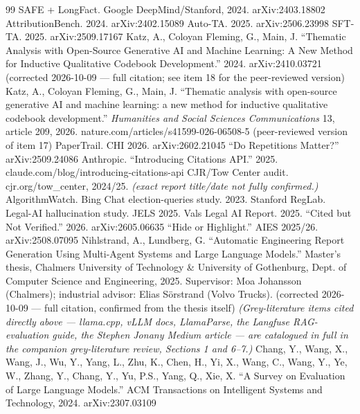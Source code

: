 \begin{thebibliography}{99}
 SAFE + LongFact. Google DeepMind/Stanford, 2024. arXiv:2403.18802
 AttributionBench. 2024. arXiv:2402.15089
 Auto-TA. 2025. arXiv:2506.23998
 SFT-TA. 2025. arXiv:2509.17167
 Katz, A., Coloyan Fleming, G., Main, J. \textquotedblleft{}Thematic Analysis with Open-Source Generative AI and Machine Learning: A New Method for Inductive Qualitative Codebook Development.\textquotedblright{} 2024. arXiv:2410.03721 (corrected 2026-10-09 — full citation; see item 18 for the peer-reviewed version)
 Katz, A., Coloyan Fleming, G., Main, J. \textquotedblleft{}Thematic analysis with open-source generative AI and machine learning: a new method for inductive qualitative codebook development.\textquotedblright{} \textit{Humanities and Social Sciences Communications} 13, article 209, 2026. nature.com/articles/s41599-026-06508-5 (peer-reviewed version of item 17)
 PaperTrail. CHI 2026. arXiv:2602.21045
 \textquotedblleft{}Do Repetitions Matter?\textquotedblright{} arXiv:2509.24086
 Anthropic. \textquotedblleft{}Introducing Citations API.\textquotedblright{} 2025. claude.com/blog/introducing-citations-api
 CJR/Tow Center audit. cjr.org/tow\_center, 2024/25. \textit{(exact report title/date not fully confirmed.)}
 AlgorithmWatch. Bing Chat election-queries study. 2023.
 Stanford RegLab. Legal-AI hallucination study. JELS 2025.
 Vals Legal AI Report. 2025.
 \textquotedblleft{}Cited but Not Verified.\textquotedblright{} 2026. arXiv:2605.06635
 \textquotedblleft{}Hide or Highlight.\textquotedblright{} AIES 2025/26. arXiv:2508.07095
 Nihlstrand, A., Lundberg, G. \textquotedblleft{}Automatic Engineering Report Generation Using Multi-Agent Systems and Large Language Models.\textquotedblright{} Master's thesis, Chalmers University of Technology \& University of Gothenburg, Dept. of Computer Science and Engineering, 2025. Supervisor: Moa Johansson (Chalmers); industrial advisor: Elias Sörstrand (Volvo Trucks). (corrected 2026-10-09 — full citation, confirmed from the thesis itself)
 \textit{(Grey-literature items cited directly above — llama.cpp, vLLM docs, LlamaParse, the Langfuse RAG-evaluation guide, the Stephen Jonany Medium article — are catalogued in full in the companion grey-literature review, Sections 1 and 6–7.)}
 Chang, Y., Wang, X., Wang, J., Wu, Y., Yang, L., Zhu, K., Chen, H., Yi, X., Wang, C., Wang, Y., Ye, W., Zhang, Y., Chang, Y., Yu, P.S., Yang, Q., Xie, X. \textquotedblleft{}A Survey on Evaluation of Large Language Models.\textquotedblright{} ACM Transactions on Intelligent Systems and Technology, 2024. arXiv:2307.03109

\end{thebibliography}
